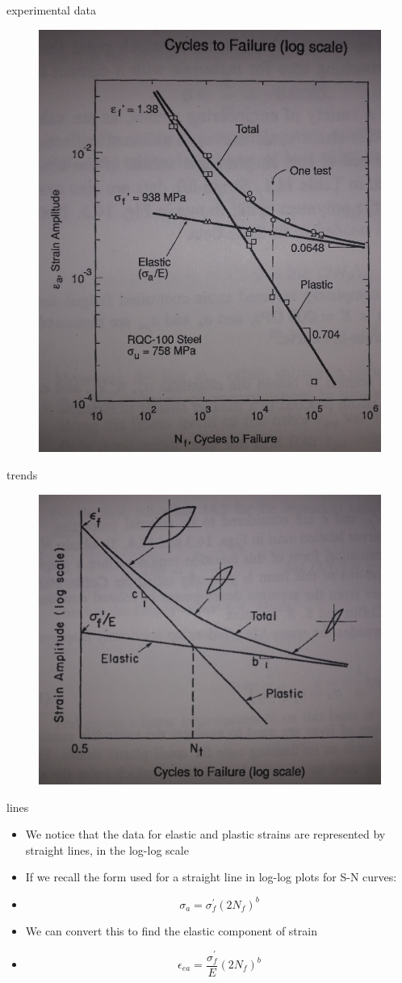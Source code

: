 \documentclass[10pt]{beamer}
\begin{document}
\begin{frame}{experimental data}
	\begin{figure}
	\centering
	\includegraphics[width=0.5\linewidth]{../Figures/strain-life}
	\label{fig:strain-life}
	\end{figure}
\end{frame}

\begin{frame}{trends}
	\begin{figure}
	\centering
	\includegraphics[width=0.7\linewidth]{../Figures/elastic-plastic}
	\label{fig:elastic-plastic}
	\end{figure}
\end{frame}

\begin{frame}{lines}
	\begin{itemize}[<+->]
		\item We notice that the data for elastic and plastic strains are represented by straight lines, in the log-log scale
		\item If we recall the form used for a straight line in log-log plots for S-N curves:
		\item[] \begin{equation}
		\sigma_a = \sigma_f^\prime (2N_f)^b
		\end{equation}
		\item We can convert this to find the elastic component of strain
		\item[] \begin{equation}
		\label{eq:elastic}
		\epsilon_{ea} = \frac{\sigma_f^\prime}{E} (2N_f)^b
		\end{equation}
	\end{itemize}
\end{frame}
\end{document}
